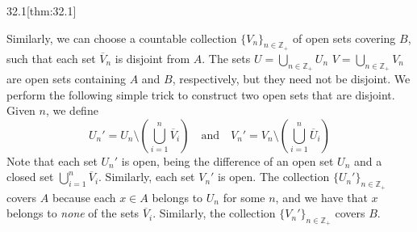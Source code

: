 \begin{thmBox}{32.1}[thm:32.1]
\begin{proofBox}
        Similarly, we can choose a countable collection 
        \( \{ V_{ n } \}_{ n \in \mathbb{Z}_{ + } } \) of open sets covering \( B \),
        such that each set \( \overline{ V }_{ n } \) is disjoint from \( A \).
        The sets \( U = \bigcup_{ n \in \mathbb{Z}_{ + } } U_{ n } \)
        \( V = \bigcup_{ n \in \mathbb{Z}_{ + } } V_{ n } \) are open sets containing 
        \( A \) and \( B \), respectively, but they need not be disjoint. 
        We perform the following simple trick to construct two open sets that are 
        disjoint. 
        Given \( n \), we define 
        \begin{equation*}
            U_{ n }' 
            = 
            U_{ n } \setminus 
            \left( \bigcup_{ i = 1 }^{ n } \overline{ V }_{ i } \right)
            \quad \mathrm{and} \quad 
            V_{ n }' 
            = 
            V_{ n } \setminus 
            \left( \bigcup_{ i = 1 }^{ n } \overline{ U }_{ i } \right)
        \end{equation*}
        Note that each set \( U_{ n }' \) is open, being the difference of an open set 
        \( U_{ n } \) and a closed set 
        \( \bigcup_{ i = 1 }^{ n } \overline{ V }_{ i } \).
        Similarly, each set \( V_{ n }' \) is open.
        The collection \( \{ U_{ n }' \}_{ n \in \mathbb{Z}_{ + } } \) covers \( A \)
        because each \( x \in A \) belongs to \( U_{ n } \) for some \( n \), and we 
        have that \( x \) belongs to \textit{none} of the sets 
        \( \overline{ V }_{ i } \). 
        Similarly, the collection \( \{ V_{ n }' \}_{ n \in \mathbb{Z}_{ + } } \) 
        covers \( B \).


\end{proofBox}
\end{thmBox}
